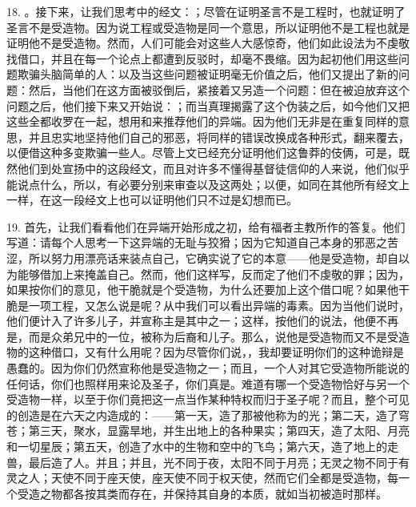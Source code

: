 18. 。接下来，让我们思考中的经文：；尽管在证明圣言不是工程时，也就证明了圣言不是受造物。因为说工程或受造物是同一个意思，所以证明他不是工程也就是证明他不是受造物。然而，人们可能会对这些人大感惊奇，他们如此设法为不虔敬找借口，并且在每一个论点上都遭到反驳时，却毫不畏缩。因为起初他们用这些问题欺骗头脑简单的人：以及当这些问题被证明毫无价值之后，他们又提出了新的问题：然后，当他们在这方面被驳倒后，紧接着又另造一个问题：但在被迫放弃这个问题之后，他们接下来又开始说：；而当真理揭露了这个伪装之后，如今他们又把这些全都收罗在一起，想用和来推荐他们的异端。因为他们无非是在重复同样的意思，并且忠实地坚持他们自己的邪恶，将同样的错误改换成各种形式，翻来覆去，以便借这种多变欺骗一些人。尽管上文已经充分证明他们这鲁莽的伎俩，可是，既然他们到处宣扬中的这段经文，而且对许多不懂得基督徒信仰的人来说，他们似乎能说点什么，所以，有必要分别来审查以及这两处；以便，如同在其他所有经文上一样，在这一段经文上也可以证明他们只不过是幻想而已。\par

19. 首先，让我们看看他们在异端开始形成之初，给有福者主教所作的答复。他们写道：请每个人思考一下这异端的无耻与狡猾；因为它知道自己本身的邪恶之苦涩，所以努力用漂亮话来装点自己，它确实说了它的本意——他是受造物，却自以为能够借加上来掩盖自己。然而，他们这样写，反而定了他们不虔敬的罪；因为，如果按你们的意见，他干脆就是个受造物，为什么还要加上这个借口呢？如果他干脆是一项工程，又怎么说是呢？从中我们可以看出异端的毒素。因为当他们说时，他们便计入了许多儿子，并宣称主是其中之一；这样，按他们的说法，他便不再是，而是众弟兄中的一位，被称为后裔和儿子。那么，说他是受造物而又不是受造物的这种借口，又有什么用呢？因为尽管你们说，，我却要证明你们的这种诡辩是愚蠢的。因为你们仍然宣称他是受造物之一；而且，一个人对其它受造物所能说的任何话，你们也照样用来论及圣子，你们真是。难道有哪一个受造物恰好与另一个受造物一样，以至于你们竟把这一点当作某种特权而归于圣子呢？而且，整个可见的创造是在六天之内造成的：——第一天，造了那被他称为的光；第二天，造了穹苍；第三天，聚水，显露旱地，并生出地上的各种果实；第四天，造了太阳、月亮和一切星辰；第五天，创造了水中的生物和空中的飞鸟；第六天，造了地上的走兽，最后造了人。并且；并且，光不同于夜，太阳不同于月亮；无灵之物不同于有灵之人；天使不同于座天使，座天使不同于权天使，然而它们全都是受造物，每一个受造之物都各按其类而存在，并保持其自身的本质，就如当初被造时那样。\par

